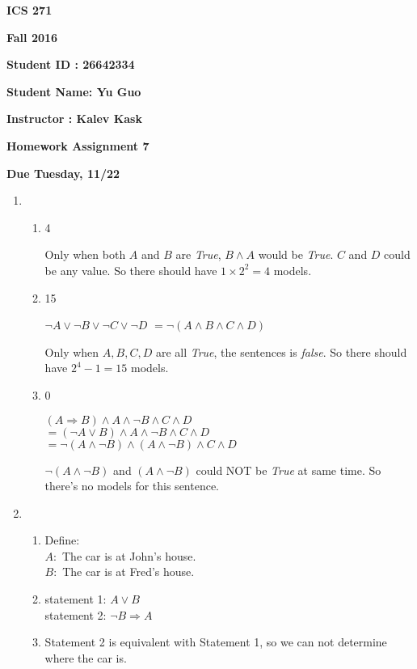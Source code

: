 \documentclass{article}
\begin{document}
{\bf ICS 271}

{\bf Fall 2016}

{\bf Student ID : 26642334}

{\bf Student Name: Yu Guo}

{\bf Instructor : Kalev Kask}

{\bf Homework Assignment 7}

{\bf Due Tuesday, 11/22}




\begin{enumerate}

\item
	\begin{enumerate}
		\item 4

		Only when both $A$ and $B$ are \textit{True}, $B \land A$ would be \textit{True}. $C$ and $D$ could be any value. So there should have $1 \times 2^2 = 4$ models.

		\item 15

		$\neg A \lor \neg B \lor \neg C \lor \neg D$ 
		$= \neg(A \land B \land C \land D)$

		Only when $A,B,C,D$ are all \textit{True}, the sentences is \textit{false}. So there should have $2^4-1=15$ models.

		\item 0

		$(A \Rightarrow B) \land A \land \neg B \land C \land D$ \\
		$ = (\neg A \lor B) \land A \land \neg B \land C \land D$ \\
		$ = \neg (A \land \neg B) \land (A \land \neg B) \land C \land D$

		$\neg (A \land \neg B)$ and $(A \land \neg B)$ could NOT be \textit{True} at same time. So there's no models for this sentence.
	\end{enumerate}


\item
	\begin{enumerate}
		\item Define: \\
		$A:$ The car is at John's house. \\
		$B:$ The car is at Fred's house. 

		\item statement 1: $A \lor B$ \\
		statement 2: $\neg B \Rightarrow A$

		\item Statement 2 is equivalent with Statement 1, so we can not determine where the car is.
	\end{enumerate}


\end{enumerate}
\end{document}
